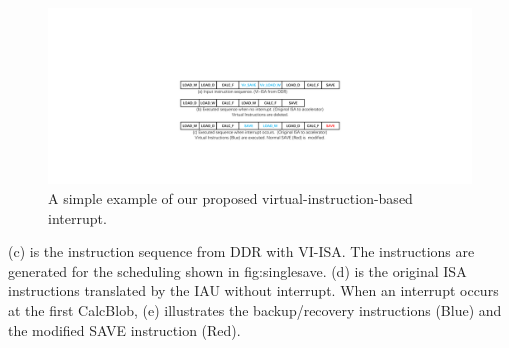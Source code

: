 \begin{figure}[t]
	\centering
	\includegraphics[width=0.9\linewidth]{fig/interexample.pdf}
	\caption{ A simple example of our proposed virtual-instruction-based interrupt. }
	\label{fig:interexample}
\end{figure}

(c) is the instruction sequence from DDR with VI-ISA. The instructions are generated for the scheduling shown in {fig:singlesave}. 
(d) is the original ISA instructions translated by the IAU without interrupt. 
When an interrupt occurs at the first CalcBlob, (e) illustrates the backup/recovery instructions (Blue) and the modified SAVE instruction (Red). 